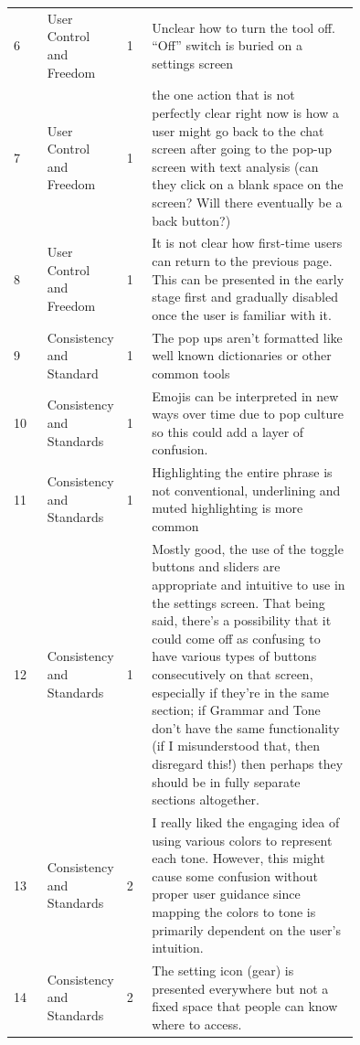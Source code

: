 \documentclass[acmsmall,screen,authorversion,nonacm]{acmart}
\begin{document}
\begin{center}
\begin{longtable}{|l|p{0.15\linewidth}|l|p{0.6\linewidth}|}
6 & User Control and Freedom & 1 & Unclear how to turn the tool off. “Off” switch is buried on a settings screen \\ \cline{1-4}
7 & User Control and Freedom & 1 & the one action that is not perfectly clear right now is how a user might go back to the chat screen after going to the pop-up screen with text analysis (can they click on a blank space on the screen? Will there eventually be a back button?) \\ \cline{1-4}
8 & User Control and Freedom & 1 & It is not clear how first-time users can return to the previous page. This can be presented in the early stage first and gradually disabled once the user is familiar with it. \\ \cline{1-4}


9 & Consistency and Standard & 1 & The pop ups aren’t formatted like well known dictionaries or other common tools \\ \cline{1-4}
10 & Consistency and Standards & 1 & Emojis can be interpreted in new ways over time due to pop culture so this could add a layer of confusion.  \\ \cline{1-4}
11 & Consistency and Standards & 1 & Highlighting the entire phrase is not conventional, underlining and muted highlighting is more common \\ \cline{1-4}
12 & Consistency and Standards & 1 & Mostly good, the use of the toggle buttons and sliders are appropriate and intuitive to use in the settings screen. That being said, there’s a possibility that it could come off as confusing to have various types of buttons consecutively on that screen, especially if they’re in the same section; if Grammar and Tone don’t have the same functionality (if I misunderstood that, then disregard this!) then perhaps they should be in fully separate sections altogether.\\ \cline{1-4}
13 & Consistency and Standards & 2 & I really liked the engaging idea of using various colors to represent each tone. However, this might cause some confusion without proper user guidance since mapping the colors to tone is primarily dependent on the user's intuition. \\ \cline{1-4}
14 & Consistency and Standards & 2 & The setting icon (gear) is presented everywhere but not a fixed space that people can know where to access. \\ \cline{1-4}


\end{longtable}
\end{center}
\end{document}
